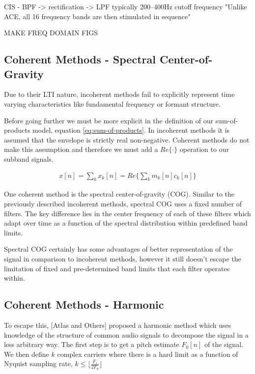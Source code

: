 \documentclass [11pt, proquest] {uwthesis}[2015/03/03]
\begin{document}
CIS - BPF -> rectification -> LPF   
    typically 200–400Hz cutoff frequency
    "Unlike ACE, all 16 frequency bands are then stimulated in sequence"


MAKE FREQ DOMAIN FIGS


\subsection{Coherent Methods - Spectral Center-of-Gravity}

Due to their LTI nature, incoherent methods fail to explicitly represent time varying characteristics like fundamental frequency or formant structure. \cite{wilson1993design}

Before going further we must be more explicit in the definition of our sum-of-products model, equation \ref{eq:sum-of-products}.  In incoherent methods it is assumed that the envelope is strictly real non-negative.  Coherent methods do not make this assumption and therefore we must add a $Re\{\cdot\}$ operation to our subband signals.

\begin{align}
x[n] = \sum\limits_k x_k[n] = Re\bigg\{ \sum\limits_k m_k[n] c_k[n] \bigg\}
\end{align}

One coherent method is the spectral center-of-gravity (COG).  Similar to the previously described incoherent methods, spectral COG uses a fixed number of filters.  The key difference lies in the center frequency of each of these filters which adapt over time as a function of the spectral distribution within predefined band limits.

Spectral COG certainly has some advantages of better representation of the signal in comparison to incoherent methods, however it still doesn't escape the limitation of fixed and pre-determined band limits that each filter operates within.

\subsection{Coherent Methods - Harmonic}

To escape this, [Atlas and Others] proposed a harmonic method which uses knowledge of the structure of common audio signals to decompose the signal in a less arbitrary way.  The first step is to get a pitch estimate $F_0[n]$ of the signal.  We then define $k$ complex carriers where there is a hard limit as a function of Nyquist sampling rate, $k \leq  \lfloor \frac{F_s}{2F_0} \rfloor$
\end{document}
